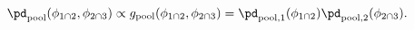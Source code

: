 \begin{equation}
  \pd_{\text{pool}} (\phi_{1 \cap 2}, \phi_{2 \cap 3}) \propto 
  g_{\text{pool}}(\phi_{1 \cap 2}, \phi_{2 \cap 3}) = 
  \pd_{\text{pool}, 1}(\phi_{1 \cap 2}) \pd_{\text{pool}, 2}(\phi_{2 \cap 3}).
  \label{eqn:silly-linear-overall}
\end{equation}
